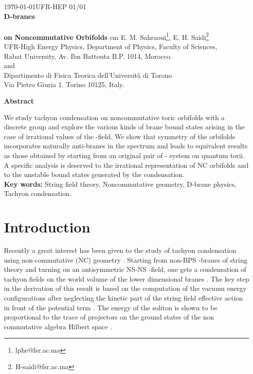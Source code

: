\documentclass[a4paper,12pt]{article}
\begin{document}
\begin{titlepage}
\begin{center}
 \today \hfill UFR-HEP 01/01\\
\vskip 2cm {\LARGE {\bf D-branes \\ ~\\ \bf on
Noncommutative Orbifolds}}
  cm
 {\large E. M. Sahraoui\footnote{lphe@fsr.ac.ma}, E.
H. Saidi\footnote{H-saidi@fsr.ac.ma} }\\
 \vskip 0.5cm \coordHE{} UFR-High Energy Physics, Department of
Physics, Faculty of Sciences,\\ Rabat University, Av. Ibn Battouta
B.P. 1014, Morocco.\\
\bigskip
 and
\\
\vskip 0.5cm \coordHE{} Dipartimento di Fisica Teorica dell'Universit\`a
di Torono\\ Via Pietro Giuria 1. Torino 10125, Italy.

\vskip 1cm
{\bf  Abstract}
\end{center}
We study tachyon condensation on noncommutative toric orbifolds
with a \coordHE{}
 discrete group and explore the various kinds of brane bound states
arising in the case of irrational values of the \coordHE{}-field. We show
that \coordHE{} symmetry of the orbifolds incorporates
naturally anti-branes in the spectrum and leads to equivalent
results as those obtained by starting from an original pair of
\coordHE{}-\coordHE{}  system on quantum torii. A specific analysis
is deserved to the irrational representation of NC orbifolds and
to the unstable bound states generated by the condensation.\\
\vskip 0.5cm {\bf Key words:} String field theory, Noncommutative
geometry, D-brane physics, Tachyon condensation.
\end{titlepage}
\newpage

\section{Introduction}

Recently a great interest has been given to the study of tachyon
condensation using non-commutative (NC) geometry \cite{a}.
 Starting from non-BPS \coordHE{}-branes of string theory and turning
on an antisymmetric NS-NS \coordHE{}-field, one gets a condensation of
tachyon fields on the world volume of the lower dimensional branes
\cite{b}. The key step in the derivation of this result is based
on the computation of the vacuum energy configurations after
neglecting the kinetic part of the string field effective action
in front of the potential term
 \cite{c}. The energy of the soliton is shown to
be proportional to the trace of projectors on the ground states of the non
commutative algebra Hilbert space \cite{d}.
\end{document}
